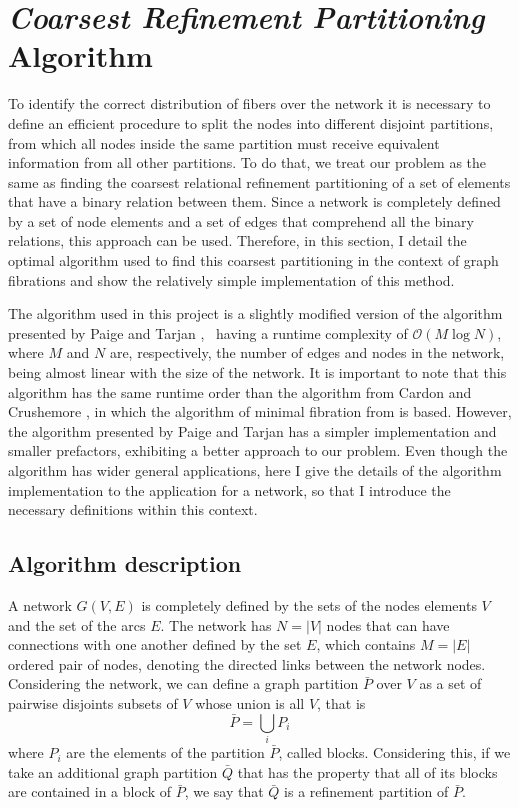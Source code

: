 \documentclass[12pt]{diazessay} %
\begin{document}

\section{\textit{Coarsest Refinement Partitioning }Algorithm}

To identify the correct distribution of fibers over the network it is necessary to define an efficient procedure to split the nodes into different disjoint partitions, from which all nodes inside the same partition must receive equivalent information from all other partitions. To do that, we treat our problem as the same as finding the coarsest relational refinement partitioning of a set of elements that have a binary relation between them. Since a network is completely defined by a set of node elements and a set of edges that comprehend all the binary relations, this approach can be used. Therefore, in this section, I detail the optimal algorithm used to find this coarsest partitioning in the context of graph fibrations and show the relatively simple implementation of this method.

The algorithm used in this project is a slightly modified version of the algorithm presented by Paige and Tarjan \cite{Tarjan1987}, \ having a runtime complexity of $\mathcal{O}(M\log N)$, where $M$ and $N$ are, respectively, the number of edges and nodes in the network, being almost linear with the size of the network. It is important to note that this algorithm has the same runtime order than the algorithm from Cardon and Crushemore \cite{Cardon1982}, in which the algorithm of minimal fibration from \cite{fibration2019} is based. However, the algorithm presented by Paige and Tarjan has a simpler implementation and smaller prefactors, exhibiting a better approach to our problem. Even though the algorithm has wider general applications, here I give the details of the algorithm implementation to the application for a network, so that I introduce the necessary definitions within this context.

\subsection{Algorithm description}

A network $G(V, E)$ is completely defined by the sets of the nodes elements $V$ and the set of the arcs $E$. The network has $N = |V|$ nodes that can have connections with one another defined by the set $E$, which contains $M = |E|$ ordered pair of nodes, denoting the directed links between the network nodes. Considering the network, we can define a graph partition $\bar{P}$ over $V$ as a set of pairwise disjoints subsets of $V$ whose union is all $V$, that is
\begin{equation}
	\bar{P} = \bigcup_{i} P_i
\end{equation}
where $P_i$ are the elements of the partition $\bar{P}$, called blocks. Considering this, if we take an additional graph partition $\bar{Q}$ that has the property that all of its blocks are contained in a block of $\bar{P}$, we say that $\bar{Q}$ is a refinement partition of $\bar{P}$.
\end{document}

